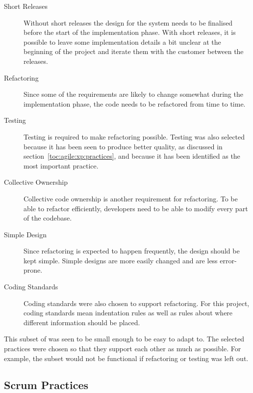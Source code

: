 \begin{description}

\item[Short Releases] Without short releases the design for the system 
needs to be finalised before the start of the implementation phase. 
With short releases, it is possible to leave some implementation 
details a bit unclear at the beginning of the project and iterate them 
with the customer between the releases.

\item[Refactoring] Since some of the requirements are likely to change
somewhat during the implementation phase, the code needs to be
refactored from time to time.

\item[Testing] Testing is required to make refactoring possible. 
Testing was also selected because it has been seen to produce better 
quality, as discussed in section~\ref{toc:agile:xp:practices}, and
because it has been identified as the most important 
practice. 

\item[Collective Ownership] Collective code ownership is another 
requirement for refactoring. To be able to refactor efficiently, 
developers need to be able to modify every part of the codebase.

\item[Simple Design] Since refactoring is expected to happen 
frequently, the design should be kept simple. Simple designs are more 
easily changed and are less error-prone.

\item[Coding Standards] Coding standards were also chosen to support 
refactoring. For this project, coding standards mean indentation rules 
as well as rules about where different information should be placed.

\end{description}

This subset of  was seen to be small enough to be easy to 
adapt to. The selected practices were chosen so that they support each 
other as much as possible. For example, the subset would not be 
functional if refactoring or testing was left out.

\subsection{Scrum Practices}
\label{toc:selected:agile:scrum}

